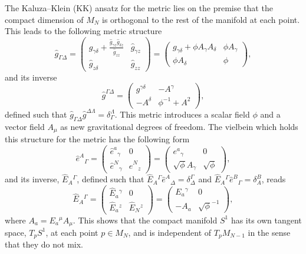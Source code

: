 \documentclass[aps,prd,12pt,superscriptaddress,showpacs,showkeys,longbibliography,reprint,nofootinbib]{revtex4-1}
\begin{document}
The Kaluza--Klein (KK) ansatz for the metric lies on the premise that the compact dimension of $M_N$ is orthogonal to the rest of the manifold at each point. This leads to the following metric structure
\begin{equation}
  \hat{g}_{\Gamma\Delta} =
  \begin{pmatrix}
    g_{\gamma\delta} +\frac{\hat{g}_{\gamma z}\hat{g}_{\delta z}}{\hat{g}_{zz}}&\hat{g}_{\gamma z}\\
    \hat{g}_{z\delta} & \hat{g}_{zz}
  \end{pmatrix}
  =
  \begin{pmatrix}
    g_{\gamma\delta} + \phi A_\gamma A_\delta&\phi A_\gamma\\
    \phi A_{\delta} & \phi
  \end{pmatrix},
\end{equation}
and its inverse
\begin{equation}
  \hat{g}^{\Gamma\Delta}=
  \begin{pmatrix}
    g^{\gamma\delta}&-A^\gamma\\
    -A^{\delta} & \phi^{-1}+A^2
  \end{pmatrix},
\end{equation}
defined such that $\hat{g}_{\Gamma\Delta}\hat{g}^{\Delta\Lambda}=\delta^\Lambda_\Gamma$. This metric introduces a scalar field $\phi$ and a vector field $A_\mu$ as new gravitational degrees of freedom. The vielbein which holds this structure for the metric has the following form
\begin{equation}
  \label{Dvielbein}
  \hat{e}^A{}_{\Gamma} =
  \begin{pmatrix}
    \hat{e}^a{}_{\gamma}& 0\\
    \hat{e}^N{}_{\gamma} & \hat{e}^N{}_{z}
  \end{pmatrix}
  =
  \begin{pmatrix}
    e^a{}_{\gamma}& 0\\
    \sqrt{\phi}A_\gamma & \sqrt{\phi}
  \end{pmatrix},
\end{equation}
and its inverse, $\hat{E}_A{}^{\Gamma}$, defined such that $\hat{E}_A{}^{\Gamma}\hat{e}^A{}_{\Delta}=\delta^\Gamma_{\Delta}$ and $\hat{E}_A{}^{\Gamma}\hat{e}^B{}_{\Gamma}=\delta^B_A$, reads
\begin{equation}
  \label{Dinversevielbein}
  \hat{E}_A{}^{\Gamma} =
  \begin{pmatrix}
    \hat{E}_a{}^{\gamma}& 0\\
    \hat{E}_a{}^{z} & \hat{E}_N{}^{z}
  \end{pmatrix}
  =
  \begin{pmatrix}
    E_a{}^{\gamma}& 0\\
    -A_a & \sqrt{\phi}^{-1}
  \end{pmatrix},
\end{equation}
where $A_a = E_a{}^\mu A_\mu$. This shows that the compact manifold $S^1$ has its own tangent space, $T_pS^1$, at each point $p\in M_N$, and is independent of $T_pM_{N-1}$ in the sense that they do not mix. %
\end{document}
